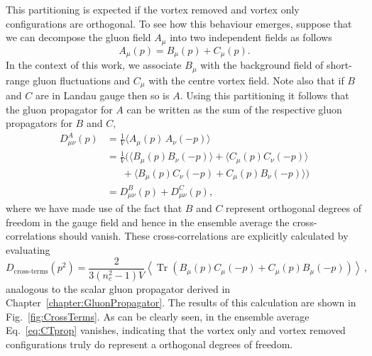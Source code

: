This partitioning is expected if the vortex removed and vortex only configurations are orthogonal. To see how this behaviour emerges, suppose that we can decompose the gluon field $A_\mu$ into two independent fields as follows
\begin{equation}
  A_\mu(p) = B_\mu(p) + C_\mu(p).
\end{equation}
In the context of this work, we associate $B_\mu$ with the background field of short-range gluon fluctuations and $C_\mu$ with the centre vortex field.
Note also that if $B$ and $C$ are in Landau gauge then so is $A.$ Using this partitioning it follows that the gluon propagator for $A$ can be written as the sum of the respective gluon propagators for $B$ and $C,$
\begin{align}
  D^{A}_{\mu\nu}(p) &= \frac{1}{V}\langle A_\mu(p) \, A_\nu(-p) \rangle\nonumber \\
  &= \frac{1}{V}\Big(\langle B_\mu(p)B_\nu(-p)\rangle + \langle C_\mu(p)C_\nu(-p)\rangle\nonumber\\
   &~~~~~~~+ \langle B_\mu(p)C_\nu(-p)+ C_\mu(p)B_\nu(-p) \rangle\Big)\nonumber \\
  &= D^{B}_{\mu\nu}(p) + D^{C}_{\mu\nu}(p),\label{eq:Partition}
\end{align}
where we have made use of the fact that $B$ and $C$ represent orthogonal degrees of freedom in the gauge field and hence in the ensemble average the cross-correlations should vanish. These cross-correlations are explicitly calculated by evaluating 
\begin{equation}
D_{\text{cross-terms}}(p^2) = \frac { 2 } { 3 \left( n _ { c } ^ { 2 } - 1 \right) V } \left\langle \operatorname { Tr } \left( B_\mu(p)C_\mu(-p)+ C_\mu(p)B_\mu(-p) \right) \right\rangle\, ,
\label{eq:CTprop}
\end{equation}
analogous to the scalar gluon propagator derived in Chapter~\ref{chapter:GluonPropagator}. The results of this calculation are shown in Fig.~\ref{fig:CrossTerms}. As can be clearly seen, in the ensemble average Eq.~\ref{eq:CTprop} vanishes, indicating that the vortex only and vortex removed configurations truly do represent a orthogonal degrees of freedom.\\  


